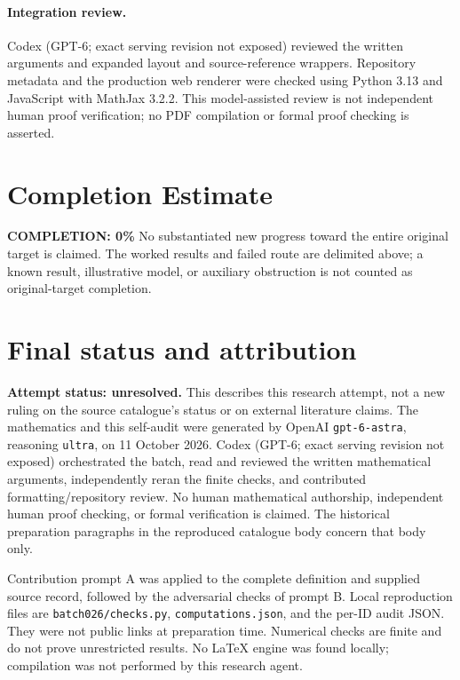 \documentclass[11pt]{article}
\begin{document}
\paragraph{Integration review.} Codex (GPT-6; exact serving revision not exposed) reviewed the written arguments and expanded layout and source-reference wrappers. Repository metadata and the production web renderer were checked using Python 3.13 and JavaScript with MathJax 3.2.2. This model-assisted review is not independent human proof verification; no PDF compilation or formal proof checking is asserted.

\section{Completion Estimate}
\noindent\textbf{COMPLETION: 0\%}
No substantiated new progress toward the entire original target is claimed. The worked results and failed route are delimited above; a known result, illustrative model, or auxiliary obstruction is not counted as original-target completion.

\section{Final status and attribution}
\textbf{Attempt status: unresolved.} This describes this research attempt, not a new ruling on the source catalogue's status or on external literature claims.
The mathematics and this self-audit were generated by OpenAI \texttt{gpt-6-astra}, reasoning \texttt{ultra}, on 11 October 2026. Codex (GPT-6; exact serving revision not exposed) orchestrated the batch, read and reviewed the written mathematical arguments, independently reran the finite checks, and contributed formatting/repository review. No human mathematical authorship, independent human proof checking, or formal verification is claimed. The historical preparation paragraphs in the reproduced catalogue body concern that body only.

Contribution prompt A was applied to the complete definition and supplied source record, followed by the adversarial checks of prompt B. Local reproduction files are \texttt{batch026/checks.py}, \texttt{computations.json}, and the per-ID audit JSON. They were not public links at preparation time. Numerical checks are finite and do not prove unrestricted results. No LaTeX engine was found locally; compilation was not performed by this research agent.
\end{document}
